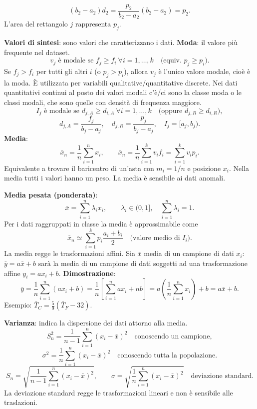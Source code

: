 \documentclass[11pt,a4paper]{article}
\newcommand{\pagina}[1]{\clearpage}
\begin{document}
\[(b_2-a_2)d_2=\frac{p_2}{b_2-a_2}(b_2-a_2)=p_2.\]
L'area del rettangolo $j$ rappresenta $p_j$.
\begin{center}\end{center}
\textbf{Valori di sintesi}: sono valori che caratterizzano i dati.
\textbf{Moda}: il valore più frequente nel dataset.
\[v_j\text{ è modale se }f_j\ge f_i\ \forall i=1,\ldots,k\quad\text{(equiv. }p_j\ge p_i\text{)}.\]
Se $f_j>f_i$ per tutti gli altri $i$ (o $p_j>p_i$), allora $v_j$ è l'unico valore modale, cioè è la moda. È utilizzata per variabili qualitative/quantitative discrete.
\pagina{5}Nei dati quantitativi continui al posto dei valori modali c'è/ci sono la classe moda o le classi modali, che sono quelle con densità di frequenza maggiore.
\[I_j\text{ è modale se }d_{j,A}\ge d_{i,A}\ \forall i=1,\ldots,k\quad\text{(oppure }d_{j,R}\ge d_{i,R}\text{)},\]
\[d_{j,A}=\frac{f_j}{b_j-a_j},\quad d_{j,R}=\frac{p_j}{b_j-a_j},\quad I_j=[a_j,b_j).\]
\textbf{Media}:
\[\boxed{\bar x_n=\frac1n\sum_{i=1}^n x_i},\qquad\bar x_n=\frac1n\sum_{i=1}^k v_i f_i=\sum_{i=1}^k v_i p_i.\]
Equivalente a trovare il baricentro di un'asta con $m_i=1/n$ e posizione $x_i$. Nella media tutti i valori hanno un peso. La media è sensibile ai dati anomali.

\textbf{Media pesata (ponderata)}:
\[\bar x=\sum_{i=1}^n\lambda_i x_i,\qquad\lambda_i\in(0,1],\quad\sum_{i=1}^n\lambda_i=1.\]
Per i dati raggruppati in classe la media è approssimabile come
\[\bar x_n\simeq\sum_{i=1}^k p_i\frac{a_i+b_i}{2}\quad\text{(valore medio di }I_i\text{)}.\]
La media regge le trasformazioni affini. Sia $\bar x$ media di un campione di dati $x_i$: $\bar y=a\bar x+b$ sarà la media di un campione di dati soggetti ad una trasformazione affine $y_i=ax_i+b$.
\pagina{6}\textbf{Dimostrazione}:
\[\bar y=\frac1n\sum_{i=1}^n(ax_i+b)=\frac1n\left[\sum_{i=1}^n ax_i+nb\right]=a\left(\frac1n\sum_{i=1}^n x_i\right)+b=a\bar x+b.\]
Esempio: $\bar T_C=\frac59(\bar T_F-32)$.

\textbf{Varianza}: indica la dispersione dei dati attorno alla media.
\[\boxed{S_n^2=\frac1{n-1}\sum_{i=1}^n(x_i-\bar x)^2}\quad\text{conoscendo un campione},\]
\[\boxed{\sigma^2=\frac1n\sum_{i=1}^n(x_i-\bar x)^2}\quad\text{conoscendo tutta la popolazione}.\]
\[S_n=\sqrt{\frac1{n-1}\sum_{i=1}^n(x_i-\bar x)^2},\qquad\sigma=\sqrt{\frac1n\sum_{i=1}^n(x_i-\bar x)^2}\quad\text{deviazione standard}.\]
La deviazione standard regge le trasformazioni lineari e non è sensibile alle traslazioni.
\end{document}

